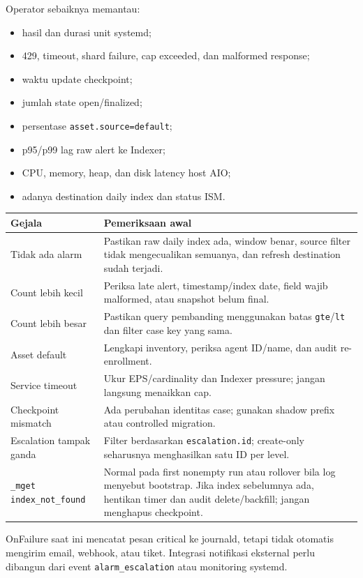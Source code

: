 \documentclass[11pt,a4paper,oneside]{report}
\DeclareRobustCommand{\code}[1]{\nolinkurl{#1}}
\begin{document}
Operator sebaiknya memantau:

\begin{itemize}
  \item hasil dan durasi unit systemd;
  \item 429, timeout, shard failure, cap exceeded, dan malformed response;
  \item waktu update checkpoint;
  \item jumlah state open/finalized;
  \item persentase \code{asset.source=default};
  \item p95/p99 lag raw alert ke Indexer;
  \item CPU, memory, heap, dan disk latency host AIO;
  \item adanya destination daily index dan status ISM.
\end{itemize}

\begin{longtable}{p{}p{}}
\toprule
\textbf{Gejala} & \textbf{Pemeriksaan awal}\\
\midrule
\endhead
Tidak ada alarm & Pastikan raw daily index ada, window benar, source filter tidak mengecualikan semuanya, dan refresh destination sudah terjadi.\\
Count lebih kecil & Periksa late alert, timestamp/index date, field wajib malformed, atau snapshot belum final.\\
Count lebih besar & Pastikan query pembanding menggunakan batas \code{gte}/\code{lt} dan filter case key yang sama.\\
Asset default & Lengkapi inventory, periksa agent ID/name, dan audit re-enrollment.\\
Service timeout & Ukur EPS/cardinality dan Indexer pressure; jangan langsung menaikkan cap.\\
Checkpoint mismatch & Ada perubahan identitas case; gunakan shadow prefix atau controlled migration.\\
Escalation tampak ganda & Filter berdasarkan \code{escalation.id}; create-only seharusnya menghasilkan satu ID per level.\\
\code{\_mget index\_not\_found} & Normal pada first nonempty run atau rollover bila log menyebut bootstrap. Jika index sebelumnya ada, hentikan timer dan audit delete/backfill; jangan menghapus checkpoint.\\
\bottomrule
\end{longtable}

OnFailure saat ini mencatat pesan critical ke journald, tetapi tidak otomatis mengirim
email, webhook, atau tiket. Integrasi notifikasi eksternal perlu dibangun dari event
\code{alarm\_escalation} atau monitoring systemd.
\end{document}
